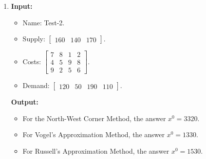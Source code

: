 \documentclass{article}
\begin{document}
\begin{enumerate}[label={(\arabic*)}, itemsep=0.25in]
    \item \textbf{Input:}
          \begin{itemize}
              \item Name: Test-2.
              \item Supply: \(\begin{bmatrix} 160 & 140 & 170 \end{bmatrix}\).
              \item Costs: \(\begin{bmatrix}
                        7 & 8 & 1 & 2 \\
                        4 & 5 & 9 & 8 \\
                        9 & 2 & 5 & 6
                    \end{bmatrix}\).
              \item Demand: \(\begin{bmatrix} 120 & 50 & 190 & 110 \end{bmatrix}\).
          \end{itemize}
          \textbf{Output:}
          \begin{itemize}
              \item For the North-West Corner Method, the answer \(x^0 = \num{3320}\).
              \item For Vogel's Approximation Method, the answer \(x^0 = \num{1330}\).
              \item For Russell's Approximation Method, the answer \(x^0 = \num{1530}\).
          \end{itemize}


\end{enumerate}
\end{document}

